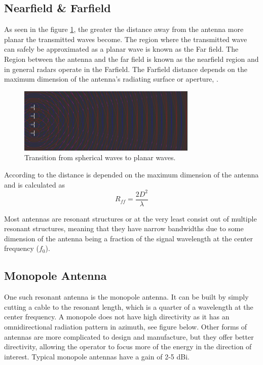 \subsection{Nearfield \& Farfield}
As seen in the figure \ref{fig:chp2_planarwave}, the greater the distance away from the antenna more planar the transmitted waves become. The region where the transmitted wave can safely be approximated as a planar wave is known as the Far field. The Region between the antenna and the far field is known as the nearfield region and in general radars operate in the Farfield. The Farfield distance depends on the maximum dimension of the antenna’s radiating surface or aperture, \cite{Farfield}.

    \begin{figure}[H]
    \centering
    \includegraphics[width=0.6\linewidth]{Figures/chp2_planarwave.png}
    \caption{Transition from spherical waves to planar waves.}
    \label{fig:chp2_planarwave}
    \end{figure}

According to \cite{Farfield} the distance is depended on the maximum dimension of the antenna and is calculated as
    \[R_{ff}=\frac{2D^{2}}{\lambda}\]

Most antennas are resonant structures or at the very least consist out of multiple resonant structures, meaning that they have narrow bandwidths due to some dimension of the antenna being a fraction of the signal wavelength at the center frequency (\(f_{0}\)).

\subsection{Monopole Antenna}
One such resonant antenna is the monopole antenna. It can be built by simply cutting a cable to the resonant length, which is a quarter of a wavelength at the center frequency. A monopole does not have high directivity as it has an omnidirectional radiation pattern in azimuth, see figure below. Other forms of antennas are more complicated to design and manufacture, but they offer better directivity, allowing the operator to focus more of the energy in the direction of interest. Typical monopole antennas have a gain of 2-5 dBi.

